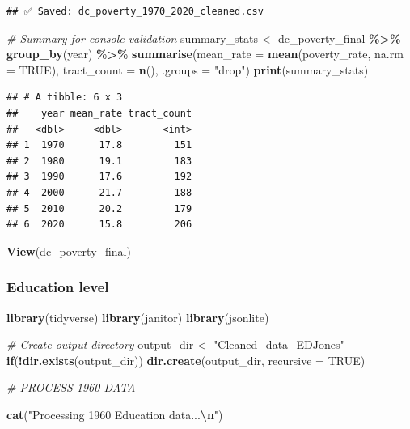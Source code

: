 \documentclass[
]{article}
\newenvironment{Shaded}{\begin{snugshade}}{\end{snugshade}}
\newcommand{\AttributeTok}[1]{\textcolor[rgb]{0.13,0.29,0.53}{#1}}
\newcommand{\CommentTok}[1]{\textcolor[rgb]{0.56,0.35,0.01}{\textit{#1}}}
\newcommand{\ConstantTok}[1]{\textcolor[rgb]{0.56,0.35,0.01}{#1}}
\newcommand{\ControlFlowTok}[1]{\textcolor[rgb]{0.13,0.29,0.53}{\textbf{#1}}}
\newcommand{\FunctionTok}[1]{\textcolor[rgb]{0.13,0.29,0.53}{\textbf{#1}}}
\newcommand{\NormalTok}[1]{#1}
\newcommand{\OtherTok}[1]{\textcolor[rgb]{0.56,0.35,0.01}{#1}}
\newcommand{\SpecialCharTok}[1]{\textcolor[rgb]{0.81,0.36,0.00}{\textbf{#1}}}
\newcommand{\StringTok}[1]{\textcolor[rgb]{0.31,0.60,0.02}{#1}}
\begin{document}
\begin{verbatim}
## ✅ Saved: dc_poverty_1970_2020_cleaned.csv
\end{verbatim}

\begin{Shaded}
\begin{Highlighting}[]
\CommentTok{\# Summary for console validation}
\NormalTok{summary\_stats }\OtherTok{\textless{}{-}}\NormalTok{ dc\_poverty\_final }\SpecialCharTok{\%\textgreater{}\%}
  \FunctionTok{group\_by}\NormalTok{(year) }\SpecialCharTok{\%\textgreater{}\%}
  \FunctionTok{summarise}\NormalTok{(}\AttributeTok{mean\_rate =} \FunctionTok{mean}\NormalTok{(poverty\_rate, }\AttributeTok{na.rm =} \ConstantTok{TRUE}\NormalTok{), }
            \AttributeTok{tract\_count =} \FunctionTok{n}\NormalTok{(),}
            \AttributeTok{.groups =} \StringTok{"drop"}\NormalTok{)}
\FunctionTok{print}\NormalTok{(summary\_stats)}
\end{Highlighting}
\end{Shaded}

\begin{verbatim}
## # A tibble: 6 x 3
##    year mean_rate tract_count
##   <dbl>     <dbl>       <int>
## 1  1970      17.8         151
## 2  1980      19.1         183
## 3  1990      17.6         192
## 4  2000      21.7         188
## 5  2010      20.2         179
## 6  2020      15.8         206
\end{verbatim}

\begin{Shaded}
\begin{Highlighting}[]
\FunctionTok{View}\NormalTok{(dc\_poverty\_final)}
\end{Highlighting}
\end{Shaded}

\subsubsection{Education level}\label{education-level}

\begin{Shaded}
\begin{Highlighting}[]
\FunctionTok{library}\NormalTok{(tidyverse)}
\FunctionTok{library}\NormalTok{(janitor)}
\FunctionTok{library}\NormalTok{(jsonlite)}

\CommentTok{\# Create output directory}
\NormalTok{output\_dir }\OtherTok{\textless{}{-}} \StringTok{"Cleaned\_data\_EDJones"}
\ControlFlowTok{if}\NormalTok{(}\SpecialCharTok{!}\FunctionTok{dir.exists}\NormalTok{(output\_dir)) }\FunctionTok{dir.create}\NormalTok{(output\_dir, }\AttributeTok{recursive =} \ConstantTok{TRUE}\NormalTok{)}


\CommentTok{\#  PROCESS 1960 DATA}

\FunctionTok{cat}\NormalTok{(}\StringTok{"Processing 1960 Education data...}\SpecialCharTok{\textbackslash{}n}\StringTok{"}\NormalTok{)}
\end{Highlighting}
\end{Shaded}
\end{document}
